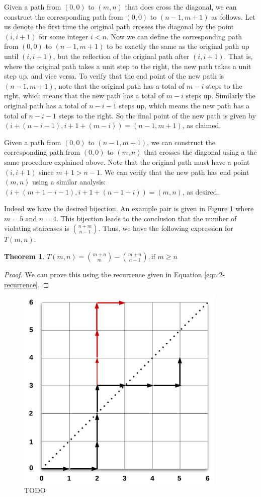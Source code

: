 \documentclass[12pt]{amsart}
\newtheorem{theorem}{Theorem}[section]
\begin{document}
Given a path from $(0,0)$ to $(m,n)$ that does cross the diagonal, we can construct the corresponding path from $(0,0)$ to $(n-1,m+1)$ as follows. Let us denote the first time the original path crosses the diagonal by the point $(i,i+1)$ for some integer $i < n$. Now we can define the corresponding path from $(0,0)$ to $(n-1,m+1)$ to be exactly the same as the original path up until $(i,i+1)$, but the reflection of the original path after $(i,i+1)$. That is, where the original path takes a unit step to the right, the new path takes a unit step up, and vice versa. To verify that the end point of the new path is $(n-1,m+1)$, note that the original path has a total of $m-i$ steps to the right, which means that the new path has a total of $m-i$ steps up. Similarly the original path has a total of $n-i-1$ steps up, which means the new path has a total of $n-i-1$ steps to the right. So the final point of the new path is given by $(i+(n-i-1), i+1+(m-i)) = (n-1,m+1)$, as claimed.

Given a path from $(0,0)$ to $(n-1,m+1)$, we can construct the corresponding path from $(0,0)$ to $(m,n)$ that crosses the diagonal using a the same procedure explained above. Note that the original path must have a point $(i,i+1)$ since $m+1>n-1$. We can verify that the new path has end point $(m,n)$ using a similar analysis: $(i+(m+1-i-1),i+1+(n-1-i)) = (m,n)$, as desired.

Indeed we have the desired bijection. An example pair is given in Figure \ref{fig:reflection} where $m=5$ and $n=4$. This bijection leads to the conclusion that the number of violating staircases is $\binom{n+m}{n-1}$. Thus, we have the following expression for $T(m,n)$.

\begin{theorem}
$T(m,n) = \binom{m+n}{m} - \binom{m+n}{n-1}, \text{if $m \geq n$}$
\end{theorem}

\begin{proof}
We can prove this using the recurrence given in Equation \ref{eqn:2-recurrence}.
\end{proof}

\begin{figure}
\includegraphics[width=10cm]{reflection.png}
\caption{TODO}
\label{fig:reflection}
\end{figure}
\end{document}
